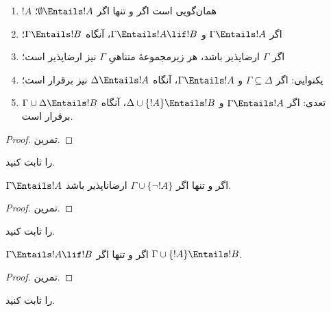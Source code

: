 \documentclass[../../../include/open-logic-section]{subfiles}
\begin{document}
\begin{prop}
\begin{enumerate}
\item $!A$ همان‌گویی است اگر و تنها اگر
  $\emptyset \Entails !A$؛
\item اگر $\Gamma \Entails !A$ و $\Gamma \Entails !A \lif !B$، آنگاه
  $\Gamma \Entails !B$؛
\item اگر $\Gamma$ ارضاپذیر باشد، هر زیرمجموعهٔ متناهیِ $\Gamma$ نیز
  ارضاپذیر است؛
\item {} یکنوایی: اگر $\Gamma \subseteq \Delta$
  و $\Gamma \Entails !A$، آنگاه $\Delta \Entails !A$ نیز برقرار است؛
\item {} تعدی: اگر $\Gamma \Entails !A$ و
  $\Delta \cup \{ !A\} \Entails !B$، آنگاه $\Gamma \cup \Delta \Entails
  !B$ برقرار است.
\end{enumerate}
\end{prop}

\begin{proof}
تمرین.
\end{proof}

\begin{prob}
 را ثابت کنید.
\end{prob}

\begin{prop}
  $\Gamma \Entails !A$ اگر و تنها اگر $\Gamma \cup \{\lnot !A\}$
  ارضاناپذیر باشد.
\end{prop}

\begin{proof}
تمرین.
\end{proof}

\begin{prob}
 را ثابت کنید.
\end{prob}

\begin{thm}
   $\Gamma \Entails !A \lif !B$ اگر و تنها
  اگر $\Gamma \cup \{!A\} \Entails !B$.
\end{thm}

\begin{proof}
تمرین.
\end{proof}

\begin{prob}
 را ثابت کنید.
\end{prob}
\end{document}
